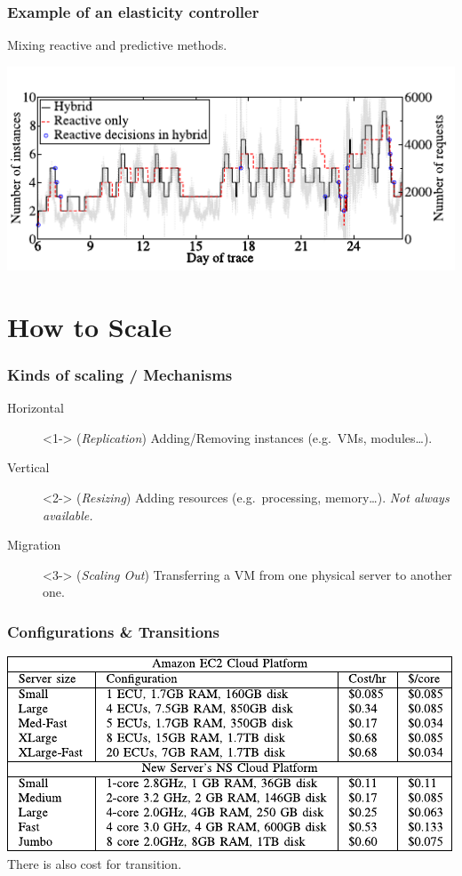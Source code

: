 \documentclass{beamer}
\begin{document}
\begin{frame}
  \frametitle{Example of an elasticity controller~\cite{moore2013coordinated}}
  \begin{center}
    Mixing reactive and predictive methods.
  \end{center}
  \pause{}
  \includegraphics[width=\textwidth]{images/elasticity5}
\end{frame}


\section{How to Scale}
\begin{frame}
  \frametitle{Kinds of scaling / Mechanisms}
  \begin{description}
    \item[Horizontal]<1-> (\textit{Replication}) Adding/Removing instances (e.g.\ VMs, modules\dots).
    \item[Vertical]<2-> (\textit{Resizing}) Adding resources (e.g.\ processing, memory\dots). \textit{Not always available.}
    \item[Migration]<3-> (\textit{Scaling Out}) Transferring a VM from one physical server to another one.
  \end{description}
\end{frame}

\begin{frame}
  \frametitle{Configurations \& Transitions}
  \includegraphics[width=\textwidth]{images/elasticity4_config}
  \vspace*{\fill}
  There is also cost for transition.
\end{frame}
\end{document}

